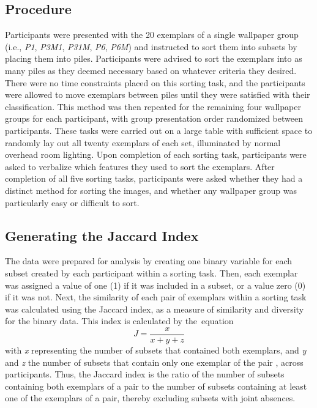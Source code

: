 \documentclass[symmetry,article,accept,pdftex,moreauthors]{Definitions/mdpi}
\begin{document}
\subsection{Procedure}
Participants were presented with the 20 exemplars of a single wallpaper group (i.e., \emph{P1}, \emph{P3M1}, \emph{P31M}, \emph{P6}, \emph{P6M}) and instructed to sort them into subsets by placing them into piles. Participants were advised to sort the exemplars into as many piles as they deemed necessary based on whatever criteria they desired. There were no time constraints placed on this sorting task, and the participants were allowed to move exemplars between piles until they were satisfied with their classification. This method was then repeated for the remaining four wallpaper groups for each participant, with group presentation order randomized between participants. These tasks were carried out on a large table with sufficient space to randomly lay out all twenty exemplars of each set, illuminated by normal overhead room lighting. Upon completion of each sorting task, participants were asked to verbalize which features they used to sort the exemplars. After completion of all five sorting tasks, participants were asked whether they had a distinct method for sorting the images, and whether any wallpaper group was particularly easy or difficult to sort.

\subsection{Generating the Jaccard Index}
The data were prepared for analysis by creating one binary variable for each subset created by each participant within a sorting task. Then, each exemplar was assigned a value of one (1) if it was included in a subset, or a value zero (0) if it was not. Next, the similarity of each pair of exemplars within a sorting task was calculated using the Jaccard index, as a measure of similarity and diversity for the binary data. This index is calculated by \mbox{the equation}  \[ J = \frac{x}{x + y + z} \] with \emph{x} representing the number of subsets that contained both exemplars, and \emph{y} and \emph{z} the number of subsets that contain only one exemplar of the pair \citep{capra_factor_2005}, across participants. Thus, the Jaccard index is the ratio of the number of subsets containing both exemplars of a pair to the number of subsets containing at least one of the exemplars of a pair, thereby excluding subsets with joint absences.
\end{document}
